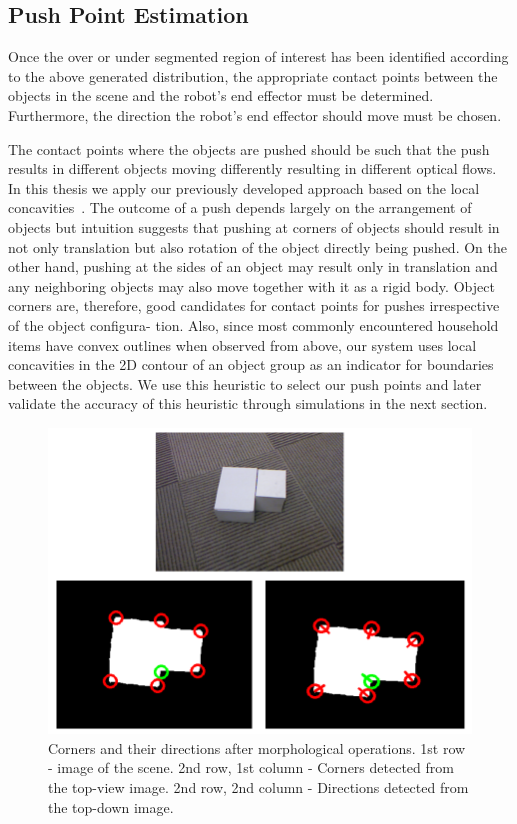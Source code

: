 \subsection{Push Point Estimation}
\label{sec:push-point}
Once the over or under segmented region of interest has been identified 
according to the above generated distribution, the  appropriate contact
points  between the objects in   the   scene  and   the   robot's   end   
effector  must   be determined. Furthermore, the  direction   the robot's  end
effector should move must be chosen.

The contact points where the objects are pushed should
be such that the push results in different objects moving
differently resulting in different optical flows.
In  this thesis we apply our previously developed approach based on 
the local concavities~\cite{bersch12interactive}. The outcome
of a push depends largely on the arrangement of objects but
intuition suggests that pushing at corners of objects should
result in not only translation but also rotation of the object
directly being pushed. On the other hand, pushing at the
sides of an object may result only in translation and any
neighboring objects may also move together with it as a
rigid body. Object corners are, therefore, good candidates for
contact points for pushes irrespective of the object configura-
tion. Also, since most
commonly  encountered  household   items  have  convex  outlines  when
observed  from  above,  our  system  uses  local
concavities in the  2D contour of an object group  as an indicator for
boundaries between the objects.
We use this heuristic to select our push points and later
validate the accuracy of this heuristic through simulations in
the next section.

\begin{figure}[tb!]
   \begin{center}
     \includegraphics[width=.9\columnwidth]{figures/corners.png}
		\vspace{-2ex}
   \caption{Corners and their directions after morphological operations. 1st row - image of the scene. 2nd row, 1st column - Corners detected from the top-view image. 2nd row, 2nd column - Directions detected from the top-down image. }
   \label{fig:corners}
 \end{center}
 \end{figure}

